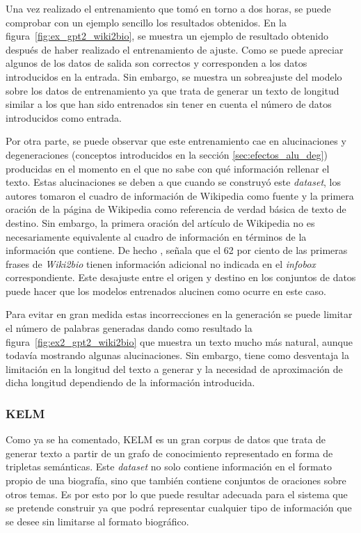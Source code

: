 Una vez realizado el entrenamiento que tomó en torno a dos horas, se puede comprobar con un ejemplo sencillo los resultados obtenidos. En la figura~\ref{fig:ex_gpt2_wiki2bio}, se muestra un ejemplo de resultado obtenido después de haber realizado el entrenamiento de ajuste. Como se puede apreciar algunos de los datos de salida son correctos y corresponden a los datos introducidos en la entrada. Sin embargo, se muestra un sobreajuste del modelo sobre los datos de entrenamiento ya que trata de generar un texto de longitud similar a los que han sido entrenados sin tener en cuenta el número de datos introducidos como entrada. 


Por otra parte, se puede observar que este entrenamiento cae en alucinaciones y degeneraciones (conceptos introducidos en la sección \ref{sec:efectos_alu_deg}) producidas en el momento en el que no sabe con qué información rellenar el texto. Estas alucinaciones se deben a que cuando se construyó este \textit{dataset}, los autores tomaron el cuadro de información de Wikipedia como fuente y la primera oración de la página de Wikipedia como referencia de verdad básica de texto de destino. Sin embargo, la primera oración del artículo de Wikipedia no es necesariamente equivalente al cuadro de información en términos de la información que contiene. De hecho \cite{dhingra2019handling}, señala que el 62 por ciento de las primeras frases de \textit{Wiki2bio} tienen información adicional no indicada en el \textit{infobox} correspondiente. Este desajuste entre el origen y destino en los conjuntos de datos puede hacer que los modelos entrenados alucinen como ocurre en este caso.

Para evitar en gran medida estas incorrecciones en la generación se puede limitar el número de palabras generadas dando como resultado la figura~\ref{fig:ex2_gpt2_wiki2bio} que muestra un texto mucho más natural, aunque todavía mostrando algunas alucinaciones. Sin embargo, tiene como desventaja la limitación en la longitud del texto a generar y la necesidad de aproximación de dicha longitud dependiendo de la información introducida.



\subsubsection{KELM}

Como ya se ha comentado, KELM es un gran corpus de datos que trata de generar texto a partir de un grafo de conocimiento representado en forma de tripletas semánticas. Este \textit{dataset} no solo contiene información en el formato propio de una biografía, sino que también contiene conjuntos de oraciones sobre otros temas. Es por esto por lo que puede resultar adecuada para el sistema que se pretende construir ya que podrá representar cualquier tipo de información que se desee sin limitarse al formato biográfico.

